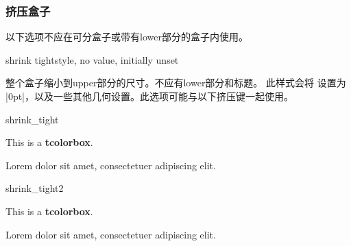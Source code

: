 \subsubsection{挤压盒子}

\begin{marker}

以下选项不应在可分盒子或带有lower部分的盒子内使用。
\end{marker}

\begin{docTcbKey}{shrink tight}{}{style, no value, initially unset}

整个盒子缩小到upper部分的尺寸。不应有lower部分和标题。
此样式会将  设置为 |0pt|，以及一些其他几何设置。此选项可能与以下挤压键一起使用。
\begin{exdispExample}{shrink_tight}

\begin{tcolorbox}
This is a \textbf{tcolorbox}.
\end{tcolorbox}

Lorem  dolor sit amet, consectetuer adipiscing elit.
\end{exdispExample}

\begin{exdispExample}{shrink_tight2}
  
  \begin{tcolorbox}
  This is a \textbf{tcolorbox}.
  \end{tcolorbox}
  
  Lorem  dolor sit amet, consectetuer adipiscing elit.
  \end{exdispExample}
\end{docTcbKey}  


